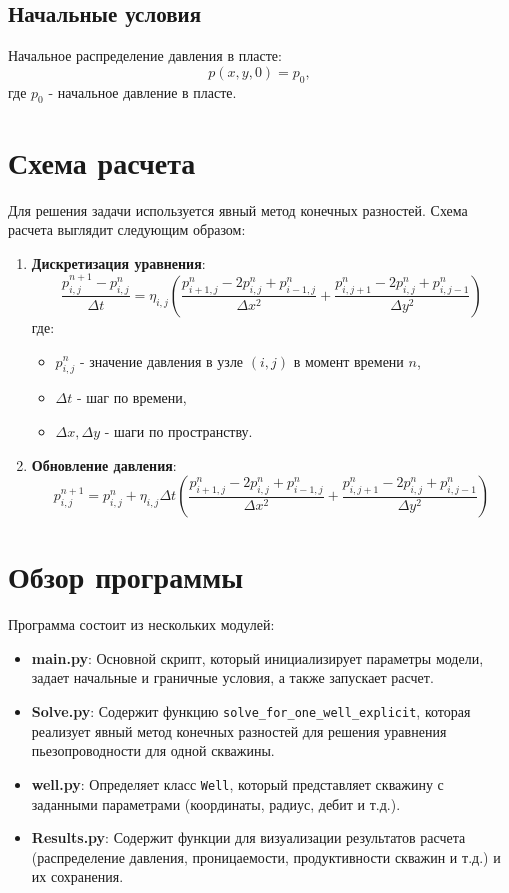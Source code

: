 \documentclass{article}
\begin{document}
\subsection{Начальные условия}

Начальное распределение давления в пласте:
\[
p(x, y, 0) = p_0,
\]
где \( p_0 \) - начальное давление в пласте.

\section{Схема расчета}

Для решения задачи используется явный метод конечных разностей. Схема расчета выглядит следующим образом:

\begin{enumerate}
    \item \textbf{Дискретизация уравнения}:
    \[
    \frac{p_{i,j}^{n+1} - p_{i,j}^n}{\Delta t} = \eta_{i,j} \left( \frac{p_{i+1,j}^n - 2p_{i,j}^n + p_{i-1,j}^n}{\Delta x^2} + \frac{p_{i,j+1}^n - 2p_{i,j}^n + p_{i,j-1}^n}{\Delta y^2} \right)
    \]
    где:
    \begin{itemize}
        \item \( p_{i,j}^n \) - значение давления в узле \( (i, j) \) в момент времени \( n \),
        \item \( \Delta t \) - шаг по времени,
        \item \( \Delta x, \Delta y \) - шаги по пространству.
    \end{itemize}

    \item \textbf{Обновление давления}:
    \[
    p_{i,j}^{n+1} = p_{i,j}^n + \eta_{i,j} \Delta t \left( \frac{p_{i+1,j}^n - 2p_{i,j}^n + p_{i-1,j}^n}{\Delta x^2} + \frac{p_{i,j+1}^n - 2p_{i,j}^n + p_{i,j-1}^n}{\Delta y^2} \right)
    \]
\end{enumerate}

\section{Обзор программы}

Программа состоит из нескольких модулей:

\begin{itemize}
    \item \textbf{main.py}: Основной скрипт, который инициализирует параметры модели, задает начальные и граничные условия, а также запускает расчет.
    \item \textbf{Solve.py}: Содержит функцию \texttt{solve\_for\_one\_well\_explicit}, которая реализует явный метод конечных разностей для решения уравнения пьезопроводности для одной скважины.
    \item \textbf{well.py}: Определяет класс \texttt{Well}, который представляет скважину с заданными параметрами (координаты, радиус, дебит и т.д.).
    \item \textbf{Results.py}: Содержит функции для визуализации результатов расчета (распределение давления, проницаемости, продуктивности скважин и т.д.) и их сохранения.
\end{itemize}
\end{document}
